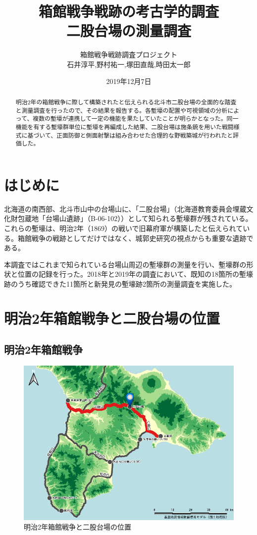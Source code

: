 \documentclass[11pt,report]{jsarticle}
\title{箱館戦争戦跡の考古学的調査 \\ \Large{二股台場の測量調査}} %
\date{2019年12月7日}
\author{箱館戦争戦跡調査プロジェクト \\石井淳平,野村祐一,塚田直哉,時田太一郎}              %
\begin{document}
 
\maketitle
\begin{abstract}
明治2年の箱館戦争に際して構築されたと伝えられる北斗市二股台場の全面的な踏査と測量調査を行ったので、その結果を報告する。各塹壕の配置や可視領域の分析によって、複数の塹壕が連携して一定の機能を果たしていたことが明らかとなった。同一機能を有する塹壕群単位に塹壕を再編成した結果、二股台場は施条銃を用いた戦闘様式に基づいて、正面防御と側面射撃は組み合わせた合理的な野戦築城が行われたと評価した。
\end{abstract}

\section{はじめに}
北海道の南西部、北斗市山中の台場山に、「二股台場」（北海道教育委員会埋蔵文化財包蔵地「台場山遺跡」（B-06-102））として知られる塹壕群が残されている。これらの塹壕は、明治2年（1869）の戦いで旧幕府軍が構築したと伝えられている。箱館戦争の戦跡としてだけではなく、城郭史研究の視点からも重要な遺跡である。

本調査ではこれまで知られている台場山周辺の塹壕群の測量を行い、塹壕群の形状と位置の記録を行った。2018年と2019年の調査において、既知の18箇所の塹壕跡のうち確認できた11箇所と新発見の塹壕跡2箇所の測量調査を実施した。

\section{明治2年箱館戦争と二股台場の位置}
\subsection{明治2年箱館戦争}

\begin{figure}[ht]
\centering
\includegraphics[width=160truemm]{../02fig/01dounan_map.pdf}
\caption{明治2年箱館戦争と二股台場の位置}
\label{dounan_map}
\end{figure}
\end{document}
